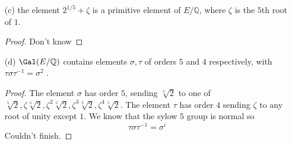 \documentclass{article}
\begin{document}
\begin{itemize}
        \item [(c)] the element $2^{1/5} + \zeta$ is a primitive element of $E/\mathbb{Q}$, where $\zeta$ is the $5$th root of $1$. 
            \begin{proof}
                Don't know
            \end{proof}

        \item [(d)] $\Gal(E/\mathbb{Q})$ contains elements $\sigma, \tau$ of orders $5$ and $4$ respectively, with $\tau \sigma  \tau^{-1} = \sigma^{ 2}$ .
            \begin{proof}
                The element $\sigma$ has order $5$, sending $\sqrt[5]{2}$ to one of $\sqrt[5]{2}, \zeta \sqrt[5]{2}, \zeta^{ 2}\sqrt[5]{2}, \zeta^{ 3}\sqrt[5]{2}, \zeta^{ 4}\sqrt[5]{2}$. The element $\tau$ has order $4$ sending $\zeta$ to any root of unity except $1$. We know that the sylow $5$ group is normal so 
                    \begin{equation*}
                        \tau \sigma \tau^{-1} = \sigma^{ i}
                    \end{equation*}
                Couldn't finish.
            \end{proof}
    \end{itemize}
\end{document}
